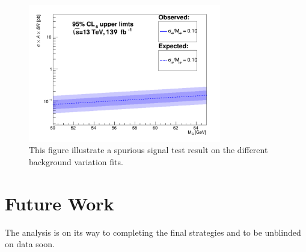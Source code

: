 \begin{figure}[!htb]
   \begin{center}
       \includegraphics[width=0.75\textwidth]{figures/chapter_dimuon/limits}
       \caption{
       This figure illustrate a spurious signal test result on the different background variation fits.}
            \label{fig:dimuonstudies}
   \end{center}
\end{figure}

\section{Future Work}
The analysis is on its way to completing the final strategies and to be unblinded on data soon.





